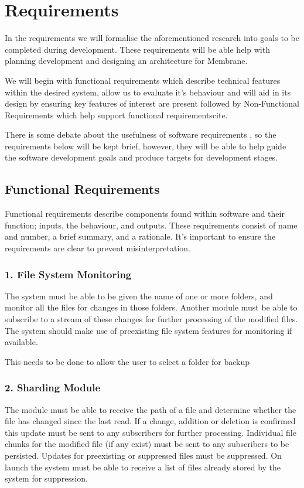 \documentclass[a4paper, 11pt, twocolumn, twoside]{report}
\begin{document}
\section{Requirements}

In the requirements we will formalise the aforementioned research into goals to be completed during development. These requirements will be able help with planning development and designing an architecture for Membrane.

We will begin with functional requirements which describe technical features within the desired system, allow us to evaluate it's behaviour and will aid in its design by ensuring key features of interest are present  followed by Non-Functional Requirements which help support functional requirements{cite}.

There is some debate about the usefulness of software requirements , so the requirements below will be kept brief, however, they will be able to help guide the software development goals and produce targets for development stages.

\subsection{Functional Requirements}

Functional requirements describe components found within software and their function; inputs, the behaviour, and outputs. These requirements consist of name and number, a brief summary, and a rationale. It's important to ensure the requirements are clear to prevent misinterpretation.

\subsubsection{1. File System Monitoring}
The system must be able to be given the name of one or more folders, and monitor all the files for changes in those folders. Another module must be able to subscribe to a stream of these changes for further processing of the modified files. The system should make use of preexisting file system features for monitoring if available.

This needs to be done to allow the user to select a folder for backup 

\subsubsection{2. Sharding Module}
The module must be able to receive the path of a file and determine whether the file has changed since the last read. If a change, addition or deletion is confirmed this update must be sent to any subscribers for further processing. Individual file chunks for the modified file (if any exist) must be sent to any subscribers to be persisted. Updates for preexisting or suppressed files must be suppressed. On launch the system must be able to receive a list of files already stored by the system for suppression.
\end{document}
